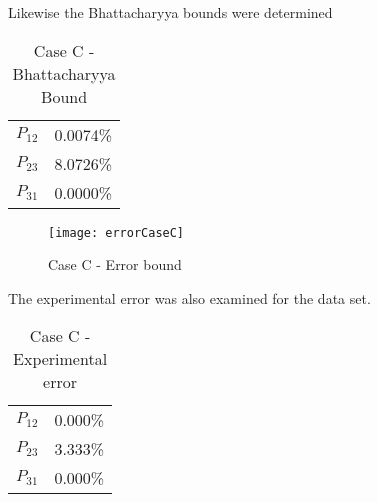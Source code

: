 Likewise the Bhattacharyya bounds were determined


\begin{table}[htb!]
\begin{center}
\begin{tabular}{ll}
$P_{12}$ & 0.0074\%\\
$P_{23}$ & 8.0726\%\\
$P_{31}$ & 0.0000\%
\end{tabular}
\end{center}
\caption{Case C - Bhattacharyya Bound}
\label{tab: case c bhatt}
\end{table}

\begin{figure}
 \centering
 \texttt{[image: errorCaseC]}
 \caption{Case C - Error bound}
 \label{case c error}
\end{figure}

The experimental error was also examined for the data set.

\begin{table}[htb]
\begin{center}
\begin{tabular}{ll}
$P_{12}$ & 0.000\%\\
$P_{23}$ & 3.333\%\\
$P_{31}$ & 0.000\%
\end{tabular}
\end{center}
\caption{Case C - Experimental error}
\label{tab: case c experiment}
\end{table}


%
